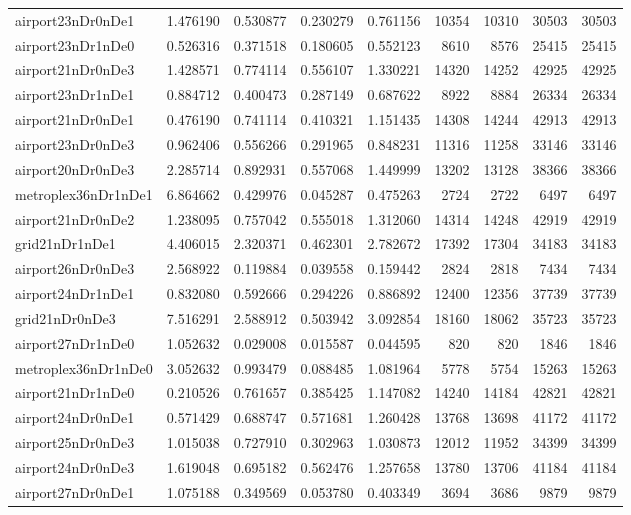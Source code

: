 \begin{longtable}{|l|r|r|r|r|r|r|r|r|}
airport23nDr0nDe1 & 1.476190 & 0.530877 & 0.230279 & 0.761156 & 10354 & 10310 & 30503 & 30503 \\
airport23nDr1nDe0 & 0.526316 & 0.371518 & 0.180605 & 0.552123 & 8610 & 8576 & 25415 & 25415 \\
airport21nDr0nDe3 & 1.428571 & 0.774114 & 0.556107 & 1.330221 & 14320 & 14252 & 42925 & 42925 \\
airport23nDr1nDe1 & 0.884712 & 0.400473 & 0.287149 & 0.687622 & 8922 & 8884 & 26334 & 26334 \\
airport21nDr0nDe1 & 0.476190 & 0.741114 & 0.410321 & 1.151435 & 14308 & 14244 & 42913 & 42913 \\
airport23nDr0nDe3 & 0.962406 & 0.556266 & 0.291965 & 0.848231 & 11316 & 11258 & 33146 & 33146 \\
airport20nDr0nDe3 & 2.285714 & 0.892931 & 0.557068 & 1.449999 & 13202 & 13128 & 38366 & 38366 \\
metroplex36nDr1nDe1 & 6.864662 & 0.429976 & 0.045287 & 0.475263 & 2724 & 2722 & 6497 & 6497 \\
airport21nDr0nDe2 & 1.238095 & 0.757042 & 0.555018 & 1.312060 & 14314 & 14248 & 42919 & 42919 \\
grid21nDr1nDe1 & 4.406015 & 2.320371 & 0.462301 & 2.782672 & 17392 & 17304 & 34183 & 34183 \\
airport26nDr0nDe3 & 2.568922 & 0.119884 & 0.039558 & 0.159442 & 2824 & 2818 & 7434 & 7434 \\
airport24nDr1nDe1 & 0.832080 & 0.592666 & 0.294226 & 0.886892 & 12400 & 12356 & 37739 & 37739 \\
grid21nDr0nDe3 & 7.516291 & 2.588912 & 0.503942 & 3.092854 & 18160 & 18062 & 35723 & 35723 \\
airport27nDr1nDe0 & 1.052632 & 0.029008 & 0.015587 & 0.044595 & 820 & 820 & 1846 & 1846 \\
metroplex36nDr1nDe0 & 3.052632 & 0.993479 & 0.088485 & 1.081964 & 5778 & 5754 & 15263 & 15263 \\
airport21nDr1nDe0 & 0.210526 & 0.761657 & 0.385425 & 1.147082 & 14240 & 14184 & 42821 & 42821 \\
airport24nDr0nDe1 & 0.571429 & 0.688747 & 0.571681 & 1.260428 & 13768 & 13698 & 41172 & 41172 \\
airport25nDr0nDe3 & 1.015038 & 0.727910 & 0.302963 & 1.030873 & 12012 & 11952 & 34399 & 34399 \\
airport24nDr0nDe3 & 1.619048 & 0.695182 & 0.562476 & 1.257658 & 13780 & 13706 & 41184 & 41184 \\
airport27nDr0nDe1 & 1.075188 & 0.349569 & 0.053780 & 0.403349 & 3694 & 3686 & 9879 & 9879 \\

\end{longtable}
